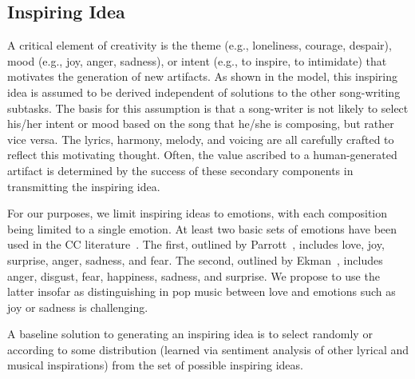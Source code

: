 \documentclass[11pt,phd]{byuprop}
\begin{document}
%

\subsection{Inspiring Idea}

A critical element of creativity is the theme (e.g., loneliness, courage, despair), mood (e.g.,  joy, anger, sadness), or intent (e.g., to inspire, to intimidate) that motivates the generation of new artifacts. As shown in the model, this inspiring idea is assumed to be derived independent of solutions to the other song-writing subtasks. The basis for this assumption is that a song-writer is not likely to select his/her intent or mood based on the song that he/she is composing, but rather vice versa. The lyrics, harmony, melody, and voicing are all carefully crafted to reflect this motivating thought. Often, the value ascribed to a human-generated artifact is determined by the success of these secondary components in transmitting the inspiring idea.

For our purposes, we limit inspiring ideas to emotions, with each composition being limited to a single emotion. At least two basic sets of emotions have been used in the CC literature~\cite{monteith2010automatic,mihalcea2012lyrics}. The first, outlined by Parrott~\cite{parrott2001emotions}, includes love, joy, surprise, anger, sadness, and fear. The second, outlined by Ekman~\cite{ekman1993facial}, includes anger, disgust, fear, happiness, sadness, and surprise. We propose to use the latter insofar as distinguishing in pop music between love and emotions such as joy or sadness is challenging.

A baseline solution to generating an inspiring idea is to select randomly or according to some distribution (learned via sentiment analysis of other lyrical and musical inspirations) from the set of possible inspiring ideas. 
\end{document}
